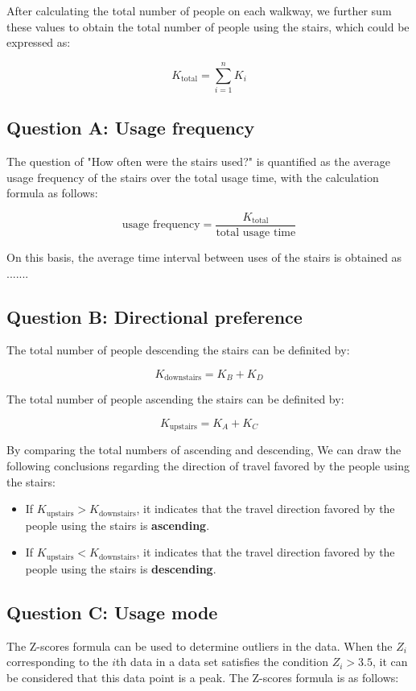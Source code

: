 \documentclass{mcmthesis}
\begin{document}
After calculating the total number of people on each walkway, we further sum these values to obtain the total number of people using the stairs, which could be expressed as:

\[ K_{\text{total}} = \sum_{i=1}^n K_i \]


\subsection{Question A: Usage frequency}

The question of "How often were the stairs used?" is quantified as the average usage frequency of the stairs over the total usage time, with the calculation formula as follows:

\[ \text{usage frequency} = \frac{K_{\text{total}}}{\text{total usage time}} \]

On this basis, the average time interval between uses of the stairs is obtained as .......

\subsection{Question B: Directional preference}

The total number of people descending the stairs can be definited by:

\[ K_{\text{downstairs}} = K_B + K_D \]

The total number of people ascending the stairs can be definited by:

\[ K_{\text{upstairs}} = K_A + K_C \]

By comparing the total numbers of ascending and descending, We can draw the following conclusions regarding the direction of travel favored by the people using the stairs:

\begin{itemize} 

\item If $K_{\text{upstairs}}>K_{\text{downstairs}}$, it indicates that the travel direction favored by the people using the stairs is \textbf{ascending}. %

\item If $K_{\text{upstairs}}<K_{\text{downstairs}}$, it indicates that the travel direction favored by the people using the stairs is \textbf{descending}. %

\end{itemize}


\subsection{Question C: Usage mode}
The Z-scores formula can be used to determine outliers in the data. When the $Z_i$ corresponding to the $i$th data in a data set satisfies the condition $Z_i>3.5$\cite{curtis2016mystery},  it can be considered that this data point is a peak. The Z-scores formula is as follows:
\end{document}
